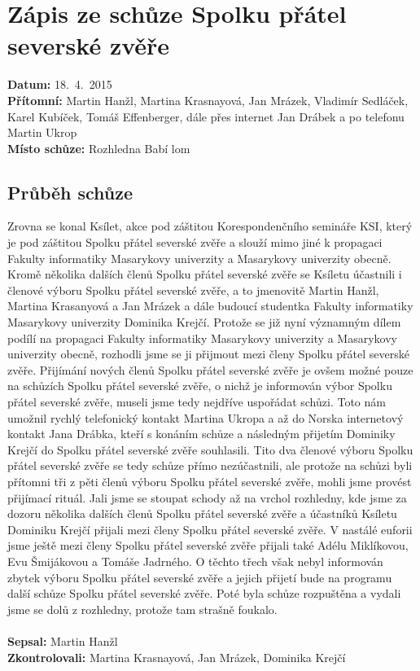 \documentclass[11pt,a4paper]{article}
\begin{document}
\section*{Zápis ze schůze Spolku přátel severské zvěře}
\textbf{Datum:} 18.~4.~2015\\
\textbf{Přítomní:} Martin Hanžl, Martina Krasnayová, Jan Mrázek, Vladimír Sedláček, Karel Kubíček, Tomáš Effenberger, dále přes internet Jan Drábek a po telefonu Martin Ukrop\\
\textbf{Místo schůze:} Rozhledna Babí lom \\
\subsection*{Průběh schůze}
Zrovna se konal Ksílet, akce pod záštitou Korespondenčního semináře KSI, který je pod záštitou Spolku přátel severské zvěře a slouží mimo jiné k propagaci Fakulty informatiky Masarykovy univerzity a Masarykovy univerzity obecně. Kromě několika dalších členů Spolku přátel severské zvěře se Ksíletu účastnili i členové výboru Spolku přátel severské zvěře, a to jmenovitě Martin Hanžl, Martina Krasanyová a Jan Mrázek a dále budoucí studentka Fakulty informatiky Masarykovy univerzity Dominika Krejčí. Protože se již nyní významným dílem podílí na propagaci Fakulty informatiky Masarykovy univerzity a Masarykovy univerzity obecně, rozhodli jsme se ji přijmout mezi členy Spolku přátel severské zvěře. Přijímání nových členů Spolku přátel severské zvěře je ovšem možné pouze na schůzích Spolku přátel severské zvěře, o nichž je informován výbor Spolku přátel severské zvěře, museli jsme tedy nejdříve uspořádat schůzi. Toto nám umožnil rychlý telefonický kontakt Martina Ukropa a až do Norska internetový kontakt Jana Drábka, kteří s konáním schůze a následným přijetím Dominiky Krejčí do Spolku přátel severské zvěře souhlasili. Tito dva členové výboru Spolku přátel severské zvěře se tedy schůze přímo nezúčastnili, ale protože na schůzi byli přítomni tři z pěti členů výboru Spolku přátel severské zvěře, mohli jsme provést přijímací rituál. Jali jsme se stoupat schody až na vrchol rozhledny, kde jsme za dozoru několika dalších členů Spolku přátel severské zvěře a účastníků Ksíletu Dominiku Krejčí přijali mezi členy Spolku přátel severské zvěře. V nastálé euforii jsme ještě mezi členy Spolku přátel severské zvěře přijali také Adélu Miklíkovou, Evu Šmijákovou a Tomáše Jadrného. O těchto třech však nebyl informován zbytek výboru Spolku přátel severské zvěře a jejich přijetí bude na programu další schůze Spolku přátel severské zvěře. Poté byla schůze rozpuštěna a vydali jsme se dolů z rozhledny, protože tam strašně foukalo.\\
\\
\textbf{Sepsal:} Martin Hanžl\\
\textbf{Zkontrolovali:} Martina Krasnayová, Jan Mrázek, Dominika Krejčí
\end{document}
